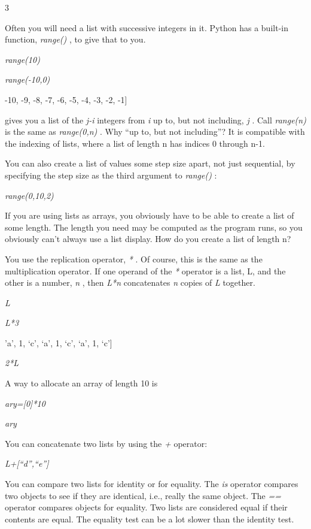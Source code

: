 3

Often you will need a list with
successive integers in it. Python has a built-in function,
\emph{range()} , to give that to you.


\emph{range(10)}




\emph{range(-10,0)}

-10, -9, -8, -7, -6, -5, -4, -3,
-2, -1{]}

 gives you a
list of the \emph{j-i} integers from \emph{i} up to, but not including,
\emph{j} . Call \emph{range(n)} is the same as \emph{range(0,n)} . Why
``up to, but not including''? It is compatible with the indexing of
lists, where a list of length n has indices 0 through n-1.

You can also create a list of
values some step size apart, not just sequential, by specifying the step
size as the third argument to \emph{range()} :


\emph{range(0,10,2)}



If you are using lists as arrays,
you obviously have to be able to create a list of some length. The
length you need may be computed as the program runs, so you obviously
can't always use a list display. How do you create a list of length n?

You use the replication operator,
\emph{*} . Of course, this is the same as the multiplication operator.
If one operand of the \emph{*} operator is a list, L, and the other is a
number, \emph{n} , then \emph{L*n} concatenates \emph{n} copies of
\emph{L} together.


\emph{L}




\emph{L*3}

'a', 1, `c', `a', 1, `c', `a',
1, `c'{]}


\emph{2*L}



A way to allocate an array of
length 10 is


\emph{ary={[}0{]}*10}


\emph{ary}



You can concatenate two lists by
using the \emph{+} operator:


\emph{L+{[}``d'',``e''{]}}



You can compare two lists for
identity or for equality. The \emph{is} operator compares two objects to
see if they are identical, i.e., really the same object. The \emph{==}
operator compares objects for equality. Two lists are considered equal
if their contents are equal. The equality test can be a lot slower than
the identity test.


